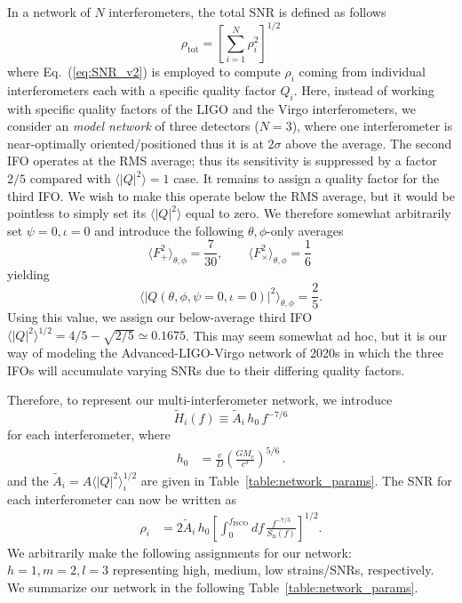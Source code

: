 \documentclass[amsmath,amssymb,aps,floats,amsfonts,notitlepage,superscriptaddress,eqsecnum,nofootinbib,10pt]{revtex4-1}
\newcommand{\f}{\frac}
\newcommand{\be}{\begin{equation}}
\newcommand{\ee}{\end{equation}}
\begin{document}
In a network of $N$ interferometers, the total SNR is defined as follows
%
\be
\rho_\text{tot} = \left[{\sum_{i=1}^N \rho^2_i}\right]^{1/2} \label{eq:SNR_total}
\ee
%
where Eq.~(\ref{eq:SNR_v2}) is employed to compute $\rho_i$ coming from individual interferometers each with a specific quality factor $Q_i$.
Here, instead of working with specific quality factors of the LIGO and the Virgo interferometers, we consider
an \emph{model network} of three detectors ($N=3$), where one interferometer is near-optimally oriented/positioned thus it is at $2\sigma$ above the average.
The second IFO operates at the RMS average; thus its sensitivity is suppressed by a factor $2/5$ compared with $\langle|Q|^2\rangle =1$ case.
It remains to assign a quality factor for the third IFO. We wish to make this operate below the RMS average, %
but it would be pointless to simply set its $\langle|Q|^2\rangle$ equal to zero. We therefore somewhat arbitrarily set $\psi=0,\iota=0$
and introduce the following $\theta,\phi$-only averages
%
\be
 \langle F_+^2\rangle_{\theta,\phi} = \frac{7}{30},\qquad \langle F_\times^2\rangle_{\theta,\phi} = \frac{1}{6}\, 
\ee
yielding
%
\be
\langle |Q(\theta,\phi,\psi=0,\iota=0)|^2 \rangle_{\theta,\phi} = \f{2}{5} \label{eq:RMS_th_phi}.
\ee
Using this value, we assign our below-average third IFO $\langle|Q|^2\rangle^{1/2}=4/5-\sqrt{2/5}\simeq 0.1675$.
This may seem somewhat ad hoc, but it is our way of modeling the Advanced-LIGO-Virgo network of 2020s in which 
the three IFOs will accumulate varying SNRs due to their differing quality factors.
%

Therefore, to represent our multi-interferometer network, we introduce %
%
\be
\tilde{H}_i(f)\equiv \tilde{A}_i\, h_0\, f^{-7/6} \label{eq:Hi_s}
\ee
%
for each interferometer, where
%
\begin{align}
h_0 &= \f{c}{D}\left(\f{G M_c}{c^3}\right)^{5/6} \label{eq:h0}\, .
\end{align}
%
and the $\tilde{A}_i =A\langle|Q|^2\rangle^{1/2}_i $ are given in Table~\ref{table:network_params}. %
The SNR for each interferometer can now be written as
%
\begin{align}
\rho_i &= 2\tilde{A}_i\, h_0 \left[\int_0^{f_\text{ISCO}} df\, \f{f^{-7/3}}{S_\text{n}(f)} \right]^{1/2}\label{eq:SNR_i}.
\end{align}
%
We arbitrarily make the following assignments for our network: $h=1, m=2, l=3$ representing high, medium, low strains/SNRs, respectively. 
We summarize our network in the following Table~\ref{table:network_params}.
\end{document}
